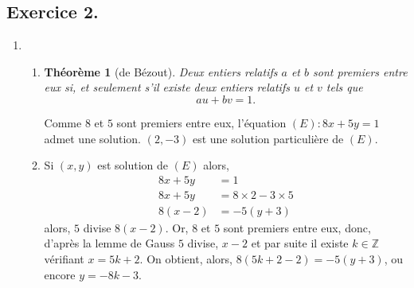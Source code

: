 \documentclass[a4paper]{article}
\newtheorem*{theorem}{Théorème}
\begin{document}
\subsection*{Exercice 2.}
\begin{enumerate}
	\item
		\begin{enumerate}
			\item	\begin{theorem}[de Bézout]
			Deux entiers relatifs $a$ et $b$ sont premiers entre eux si, et seulement s'il existe deux entiers relatifs $u$ et $v$ tels que $$au + bv = 1.$$
		\end{theorem}
		Comme $8$ et $5$ sont premiers entre eux, l'équation $(E):8x+5y=1$ admet une solution. $(2,-3)$ est une solution particulière de $(E)$.
	\item  Si $(x,y)$ est solution de $(E)$ alors,
	\begin{align*}
		8x+5y&=1\\
		8x+5y&=8\times2-3\times5\\
		8(x-2)&=-5(y+3)
	\end{align*}
	alors, $5$ divise $8(x-2)$. Or, $8$ et $5$ sont premiers entre eux, donc, d'après la lemme de Gauss $5$ divise, $x-2$ et par suite il existe $k\in\mathbb{Z}$ vérifiant $x=5k+2$. On obtient, alors, $8(5k+2-2)=-5(y+3)$, ou encore $y=-8k-3$.


\end{enumerate}
\end{enumerate}
\end{document}

